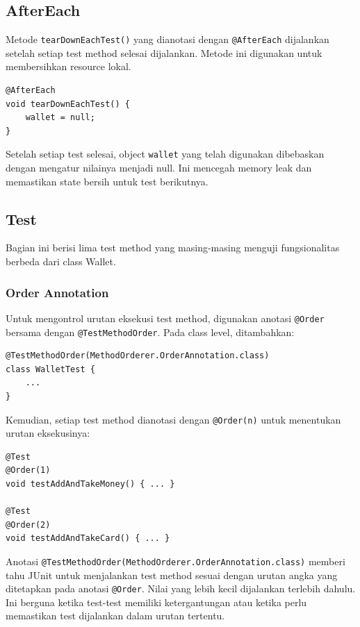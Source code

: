 \documentclass[a4paper,oneside,11pt]{book}
\begin{document}
\subsection{AfterEach}
Metode \texttt{tearDownEachTest()} yang dianotasi dengan \texttt{@AfterEach} dijalankan setelah setiap test method selesai dijalankan. Metode ini digunakan untuk membersihkan resource lokal.

\begin{lstlisting}[style=javastyle]
@AfterEach
void tearDownEachTest() {
    wallet = null;
}
\end{lstlisting}

Setelah setiap test selesai, object \texttt{wallet} yang telah digunakan dibebaskan dengan mengatur nilainya menjadi null. Ini mencegah memory leak dan memastikan state bersih untuk test berikutnya.

\subsection{Test}
Bagian ini berisi lima test method yang masing-masing menguji fungsionalitas berbeda dari class Wallet.

\subsubsection{Order Annotation}
Untuk mengontrol urutan eksekusi test method, digunakan anotasi \texttt{@Order} bersama dengan \texttt{@TestMethodOrder}. Pada class level, ditambahkan:

\begin{lstlisting}[style=javastyle]
@TestMethodOrder(MethodOrderer.OrderAnnotation.class)
class WalletTest {
    ...
}
\end{lstlisting}

Kemudian, setiap test method dianotasi dengan \texttt{@Order(n)} untuk menentukan urutan eksekusinya:

\begin{lstlisting}[style=javastyle]
@Test
@Order(1)
void testAddAndTakeMoney() { ... }

@Test
@Order(2)
void testAddAndTakeCard() { ... }
\end{lstlisting}

Anotasi \texttt{@TestMethodOrder(MethodOrderer.OrderAnnotation.class)} memberi tahu JUnit untuk menjalankan test method sesuai dengan urutan angka yang ditetapkan pada anotasi \texttt{@Order}. Nilai yang lebih kecil dijalankan terlebih dahulu. Ini berguna ketika test-test memiliki ketergantungan atau ketika perlu memastikan test dijalankan dalam urutan tertentu.
\end{document}
